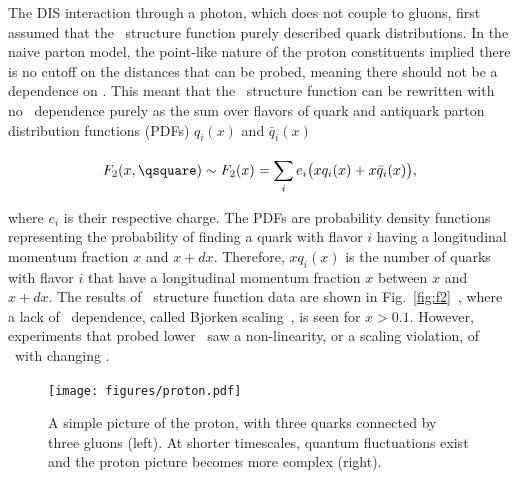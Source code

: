 The DIS interaction through a photon, which does not couple to gluons, first assumed that the \ftwo\ structure function purely described quark distributions. In the naive parton model, the point-like nature of the proton constituents implied there is no cutoff on the distances that can be probed, meaning there should not be a dependence on \qsquare. This meant that the \ftwo\ structure function can be rewritten with no \qsquare\ dependence purely as the sum over flavors of quark and antiquark parton distribution functions (PDFs) $q_{i}(x)$ and $\bar{q}_{i}(x)$

\begin{equation}
F_{2}(x,\qsquare) \sim F_{2}(x) = \sum_{i}^{}e_{i}\big(xq_{i}(x) + x\bar{q}_{i}(x)\big),
\end{equation}

where $e_{i}$ is their respective charge. The PDFs are probability density functions representing the probability of finding a quark with flavor $i$ having a longitudinal momentum fraction $x$ and $x+dx$. Therefore, $xq_{i}(x)$ is the number of quarks with flavor $i$ that have a longitudinal momentum fraction $x$ between $x$ and $x+dx$. The results of \ftwo\ structure function data are shown in Fig.~\ref{fig:f2}~\cite{Abramowicz:2014jak, Pasechnik:2016wkt, Adams:1996gu, Evans:2008zzb,Whitlow:1991uw}, where a lack of \qsquare\ dependence, called Bjorken scaling~\cite{Bjorken:1968dy}, is seen for $x>0.1$. However, experiments that probed lower \xb\ saw a non-linearity, or a scaling violation, of \ftwo\ with changing \qsquare.

\begin{figure}
	\centerline{
		\texttt{[image: figures/proton.pdf]} 
	}
	\caption{A simple picture of the proton, with three quarks connected by three gluons (left). At shorter timescales, quantum fluctuations exist and the proton picture becomes more complex (right).  }
	\label{fig:proton}
\end{figure}


